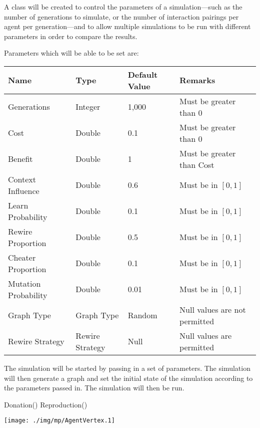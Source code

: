 A class will be created to control the parameters of a simulation---such
as the number of generations to simulate, or the number of interaction
pairings per agent per generation---and to allow multiple simulations to
be run with different parameters in order to compare the results.

Parameters which will be able to be set are:

\begin{tabular}{llll}
    Name & Type & Default Value & Remarks \\
    \hline
    Generations & Integer & 1,000 & Must be greater than 0\\
    Cost & Double & 0.1 & Must be greater than 0 \\
    Benefit & Double & 1 & Must be greater than Cost \\
    Context Influence & Double & 0.6 & Must be in $[0, 1]$ \\
    Learn Probability & Double & 0.1 & Must be in $[0, 1]$ \\
    Rewire Proportion & Double & 0.5 & Must be in $[0, 1]$ \\
    Cheater Proportion & Double & 0.1 & Must be in $[0, 1]$ \\
    Mutation Probability & Double & 0.01 & Must be in $[0, 1]$ \\
    Graph Type & Graph Type & Random & Null values are not permitted \\
    Rewire Strategy & Rewire Strategy & Null & Null values are permitted
    \\
\end{tabular}

The simulation will be started by passing in a set of parameters.
The simulation will then generate a graph and set the initial state of
the simulation according to the parameters passed in.
The simulation will then be run.

\begin{algorithmic}
    \State Donation()
    \State Reproduction()
\EndWhile
\end{algorithmic}

\texttt{[image: ./img/mp/AgentVertex.1]}
